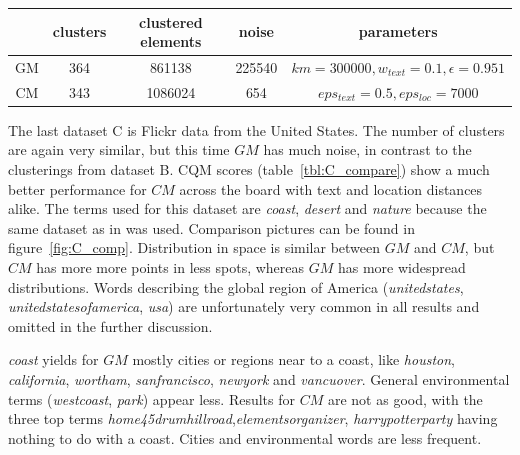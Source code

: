 

%
\newpage
\begin{center}
\small
{}
\begin{tabular}{cSSSc}
\toprule
 & {clusters} &{clustered elements}&{noise}&{parameters}\\
\midrule
GM & 364 & 861138 & 225540&$km=300000, w_{text} = 0.1, \epsilon = 0.951$\\
CM & 343 & 1086024 & 654&$eps_{text} = 0.5, eps_{loc} = 7000$\\
\bottomrule
\end{tabular}
\end{center}
%
The last dataset C is Flickr data from the United States. The number of clusters are again very similar, but this time $GM$ has much noise, in contrast to the clusterings from dataset B. CQM scores (table~\ref{tbl:C_compare}) show a much better performance for $CM$ across the board with text and location distances alike. 
%
%
The terms used for this dataset are \emph{coast}, \emph{desert} and \emph{nature} because the same dataset as in \cite{Sengstock2012a} was used. Comparison pictures can be found in figure~\ref{fig:C_comp}. Distribution in space is similar between $GM$ and $CM$, but $CM$ has more more points in less spots, whereas $GM$ has more widespread distributions. Words describing the global region of America (\emph{unitedstates}, \emph{unitedstatesofamerica}, \emph{usa}) are unfortunately very common in all results and omitted in the further discussion.

\emph{coast} yields for $GM$ mostly cities or regions near to a coast, like \emph{houston}, \emph{california}, \emph{wortham}, \emph{sanfrancisco}, \emph{newyork} and \emph{vancuover}. General environmental terms (\emph{westcoast}, \emph{park}) appear less. Results for $CM$ are not as good, with the three top terms \emph{home45drumhillroad},\emph{elementsorganizer}, \emph{harrypotterparty} having nothing to do with a coast. Cities and environmental words are less frequent.

